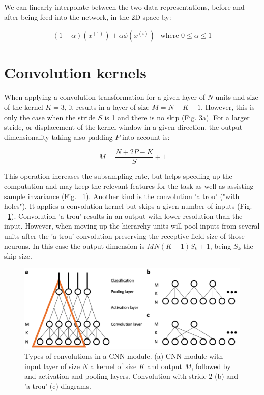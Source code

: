 \noindent
We can linearly interpolate between the two data representations, before and 
after being feed into the network, in the 2D space by:

\[
(1-\alpha)(x^{(1)}) + \alpha \phi (x^{(i)}) ~~\text{ where } 0 \leq \alpha \leq 1
\]

\section{Convolution kernels}
\noindent
When applying a convolution transformation for a given layer of $N$ units and size of the kernel $K = 3$, 
it results in a layer of size $M = N-K+1$. However, this is only the case when the stride $S$ is 1 
and there is no skip (Fig. 3a). For a larger stride, or displacement of the kernel window in a given direction, 
the output dimensionality taking also padding $P$ into account is:

\[
 M = \frac{N + 2P - K}{S} + 1
\]

\noindent
This operation increases the subsampling rate, but helps speeding up the computation 
and may keep the relevant features for the task as well as assisting sample invariance (Fig. ~\ref{fig:ConvolutionATrou}). 
Another kind is the convolution 'a trou' ("with holes"). 
It applies a convolution kernel but skips a given number of inputs (Fig. ~\ref{fig:ConvolutionATrou}). 
Convolution 'a trou' results in an output with lower resolution than the input. 
However, when moving up the hierarchy units will pool inputs from several units after the 'a trou' convolution 
preserving the receptive field size of those neurons. In this case the output dimension is $M N(K-1)S_k +1$, being $S_k$ the skip size.

\begin{figure}[!h]
\centering
\includegraphics[width=170mm]{lectures/04-a/images/ConvolutionATrou.png}
\caption{Types of convolutions in a CNN module. (a) CNN module with input layer of size $N$ a kernel of size $K$ and output $M$, followed by and activation and pooling layers. Convolution with stride $2$ (b) and 'a trou' (c) diagrams.}
\label{fig:ConvolutionATrou}
\end{figure}

